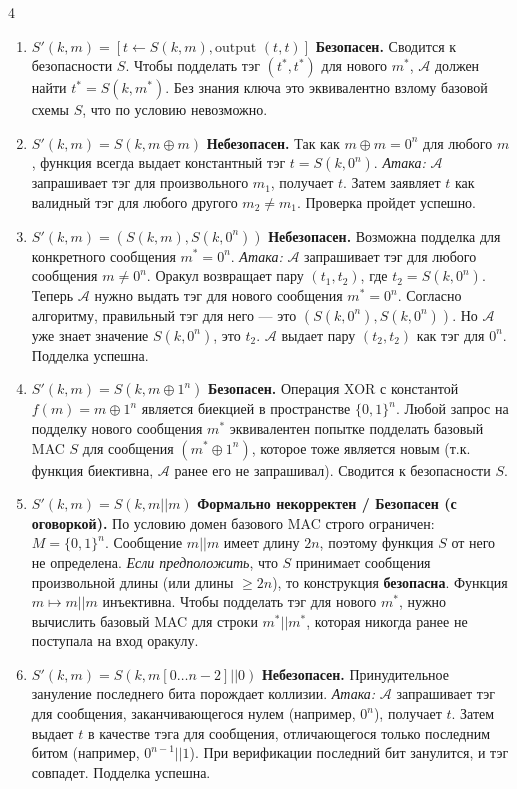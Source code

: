 ﻿\documentclass[8pt,a4paper,landscape]{extarticle}
\begin{document}
\begin{multicols*}{4}
\begin{enumerate}
\def\labelenumi{\arabic{enumi}.}
\item
  \textbf{\(S'(k, m) = [t \leftarrow S(k,m), \text{output } (t, t)]\)} \textbf{Безопасен.} Сводится к безопасности \(S\). Чтобы подделать тэг \((t^*, t^*)\) для нового \(m^*\), \(\mathcal{A}\) должен найти \(t^* = S(k, m^*)\). Без знания ключа это эквивалентно взлому базовой схемы \(S\), что по условию невозможно.
\item
  \textbf{\(S'(k, m) = S(k, m \oplus m)\)} \textbf{Небезопасен.} Так как \(m \oplus m = 0^n\) для любого \(m\), функция всегда выдает константный тэг \(t = S(k, 0^n)\). \emph{Атака:} \(\mathcal{A}\) запрашивает тэг для произвольного \(m_1\), получает \(t\). Затем заявляет \(t\) как валидный тэг для любого другого \(m_2 \neq m_1\). Проверка пройдет успешно.
\item
  \textbf{\(S'(k, m) = (S(k, m), S(k, 0^n))\)} \textbf{Небезопасен.} Возможна подделка для конкретного сообщения \(m^* = 0^n\). \emph{Атака:} \(\mathcal{A}\) запрашивает тэг для любого сообщения \(m \neq 0^n\). Оракул возвращает пару \((t_1, t_2)\), где \(t_2 = S(k, 0^n)\). Теперь \(\mathcal{A}\) нужно выдать тэг для нового сообщения \(m^* = 0^n\). Согласно алгоритму, правильный тэг для него --- это \((S(k, 0^n), S(k, 0^n))\). Но \(\mathcal{A}\) уже знает значение \(S(k, 0^n)\), это \(t_2\). \(\mathcal{A}\) выдает пару \((t_2, t_2)\) как тэг для \(0^n\). Подделка успешна.
\item
  \textbf{\(S'(k, m) = S(k, m \oplus 1^n)\)} \textbf{Безопасен.} Операция XOR с константой \(f(m) = m \oplus 1^n\) является биекцией в пространстве \(\{0,1\}^n\). Любой запрос на подделку нового сообщения \(m^*\) эквивалентен попытке подделать базовый MAC \(S\) для сообщения \((m^* \oplus 1^n)\), которое тоже является новым (т.к. функция биективна, \(\mathcal{A}\) ранее его не запрашивал). Сводится к безопасности \(S\).
\item
  \textbf{\(S'(k, m) = S(k, m || m)\)} \textbf{Формально некорректен / Безопасен (с оговоркой).} По условию домен базового MAC строго ограничен: \(M=\{0,1\}^n\). Сообщение \(m||m\) имеет длину \(2n\), поэтому функция \(S\) от него не определена. \emph{Если предположить}, что \(S\) принимает сообщения произвольной длины (или длины \(\ge 2n\)), то конструкция \textbf{безопасна}. Функция \(m \mapsto m||m\) инъективна. Чтобы подделать тэг для нового \(m^*\), нужно вычислить базовый MAC для строки \(m^* || m^*\), которая никогда ранее не поступала на вход оракулу.
\item
  \textbf{\(S'(k, m) = S(k, m[0\dots n-2] || 0)\)} \textbf{Небезопасен.} Принудительное зануление последнего бита порождает коллизии. \emph{Атака:} \(\mathcal{A}\) запрашивает тэг для сообщения, заканчивающегося нулем (например, \(0^n\)), получает \(t\). Затем выдает \(t\) в качестве тэга для сообщения, отличающегося только последним битом (например, \(0^{n-1}||1\)). При верификации последний бит занулится, и тэг совпадет. Подделка успешна.
\end{enumerate}


\end{multicols*}
\end{document}
